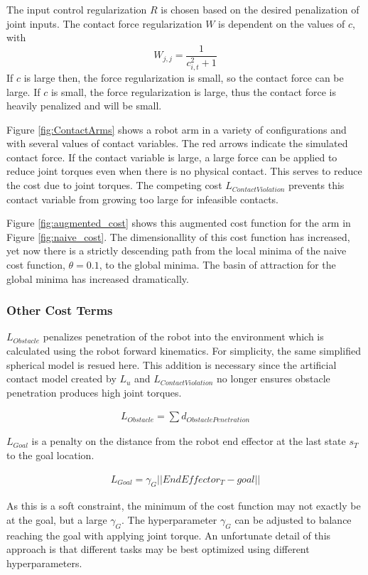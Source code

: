 \documentclass[../thesis.tex]{subfiles}
\begin{document}
The input control regularization $R$ is chosen based on the desired penalization of joint inputs. The contact force regularization $W$ is dependent on the values of $c$, with 
$$W_{j,j} = \frac{1}{c_{i,t}^2 + 1}$$
If $c$ is large then, the force regularization is small, so the contact force can be large.
If $c$ is small, the force regularization is large, thus the contact force is heavily penalized and will be small.

Figure \ref{fig:ContactArms} shows a robot arm in a variety of configurations and with several values of contact variables.
The red arrows indicate the simulated contact force.
If the contact variable is large, a large force can be applied to reduce joint torques even when there is no physical contact.
This serves to reduce the cost due to joint torques.
The competing cost $L_{Contact Violation}$ prevents this contact variable from growing too large for infeasible contacts.


Figure \ref{fig:augmented_cost} shows this augmented cost function for the arm in Figure \ref{fig:naive_cost}.
The dimensionallity of this cost function has increased, yet now there is a strictly descending path from the local minima of the naive cost function, $\theta=0.1$, to the global minima.
The basin of attraction for the global minima has increased dramatically.




\subsubsection{Other Cost Terms}
$L_{Obstacle}$ penalizes penetration of the robot into the environment which is calculated using the robot forward kinematics.
For simplicity, the same simplified spherical model is resued here.
This addition is necessary since the artificial contact model created by $L_u$ and $L_{ContactViolation}$ no longer ensures obstacle penetration produces high joint torques.

\begin{align}
  L_{Obstacle} = \sum d_{ObstaclePenetration}
\end{align}

$L_{Goal}$ is a penalty on the distance from the robot end effector at the last state $s_T$ to the goal location.

\begin{align}
  L_{Goal} = \gamma_G ||EndEffector_T - goal||
\end{align}

As this is a soft constraint, the minimum of the cost function may not exactly be at the goal, but a large $\gamma_G$.
The hyperparameter $\gamma_G$ can be adjusted to balance reaching the goal with applying joint torque.
An unfortunate detail of this approach is that different tasks may be best optimized using different hyperparameters.
\end{document}
